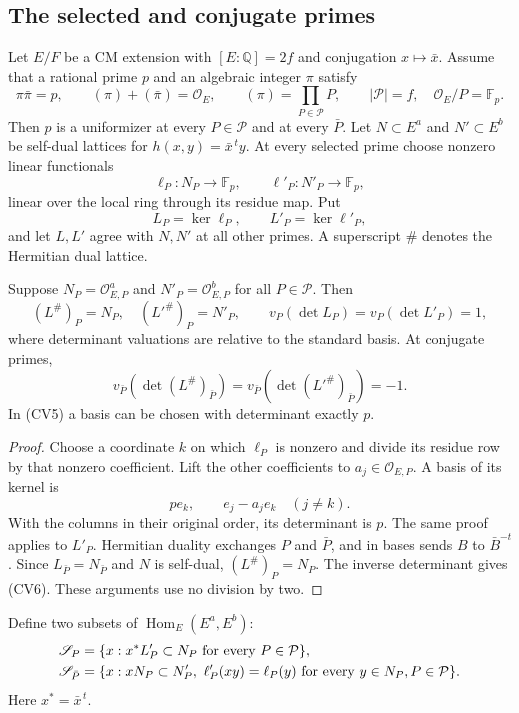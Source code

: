 \subsection{The selected and conjugate primes}

Let $E/F$ be a CM extension with $[E:\mathbb Q]=2f$ and conjugation
$x\mapsto\bar x$.  Assume that a rational prime $p$ and an algebraic
integer $\pi$ satisfy
\[
 \pi\bar\pi=p,\qquad (\pi)+(\bar\pi)=\mathcal O_E,\qquad
 (\pi)=\prod_{P\in\mathcal P}P,\qquad
 |\mathcal P|=f,\quad\mathcal O_E/P=\mathbb F_p.
 \tag{CV4}
\]
Then $p$ is a uniformizer at every $P\in\mathcal P$ and at every
$\bar P$.  Let $N\subset E^a$ and $N'\subset E^b$ be self-dual
lattices for $h(x,y)=\bar x^{\,t}y$.  At every selected prime choose
nonzero linear functionals
\[
 \ell_P:N_P\to\mathbb F_p,\qquad
 \ell'_P:N'_P\to\mathbb F_p,
\]
linear over the local ring through its residue map.  Put
\[
 L_P=\ker\ell_P,\qquad L'_P=\ker\ell'_P,
\]
and let $L,L'$ agree with $N,N'$ at all other primes.  A superscript
$\#$ denotes the Hermitian dual lattice.

\begin{lemma}\label{cv-kernel-lattices}
Suppose $N_P=\mathcal O_{E,P}^a$ and
$N'_P=\mathcal O_{E,P}^b$ for all $P\in\mathcal P$.
Then
\[
 (L^\#)_P=N_P,\quad (L'^\#)_P=N'_P,
 \qquad v_P(\det L_P)=v_P(\det L'_P)=1,
 \tag{CV5}
\]
where determinant valuations are relative to the standard basis.
At conjugate primes,
\[
 v_{\bar P}(\det(L^\#)_{\bar P})
 =v_{\bar P}(\det(L'^\#)_{\bar P})=-1.
 \tag{CV6}
\]
In (CV5) a basis can be chosen with determinant exactly $p$.
\end{lemma}
\begin{proof}
Choose a coordinate $k$ on which $\ell_P$ is nonzero and divide its
residue row by that nonzero coefficient.  Lift the other coefficients
to $a_j\in\mathcal O_{E,P}$.  A basis of its kernel is
\[
                  p e_k,\qquad e_j-a_j e_k\quad(j\ne k).
\]
With the columns in their original order, its determinant is $p$.
The same proof applies to $L'_P$.
Hermitian duality exchanges $P$ and $\bar P$, and in bases sends
$B$ to $\bar B^{-t}$.  Since $L_{\bar P}=N_{\bar P}$ and $N$ is
self-dual, $(L^\#)_P=N_P$.  The inverse determinant gives (CV6).
These arguments use no division by two.
\end{proof}

Define two subsets of $\operatorname{Hom}_E(E^a,E^b)$:
\begin{align}
 \mathscr S_P&=\{x:x^*L'_P\subset N_P
                                \text{ for every }P\in\mathcal P\},
                         \label{cv-supports}\\
 \mathscr S_{\bar P}&=\{x:xN_P\subset N'_P,
                \ \ell'_P(xy)=\ell_P(y)
                \text{ for every }y\in N_P, P\in\mathcal P\}.
                         \notag
\end{align}
Here $x^*=\bar x^{\,t}$.

